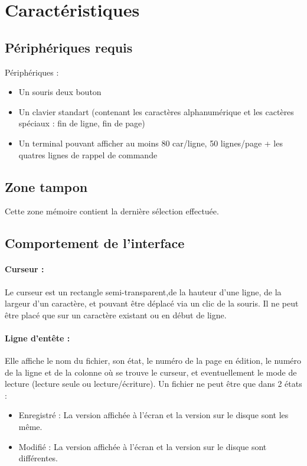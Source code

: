 
\section{Caractéristiques}
\subsection{Périphériques requis}
Périphériques :
\begin{itemize}
	\item Un souris deux bouton
	\item Un clavier standart (contenant les caractères alphanumérique et les cactères spéciaux : fin de ligne, fin de page)
	\item Un terminal pouvant afficher au moins 80 car/ligne, 50 lignes/page + les quatres lignes de rappel de commande
\end{itemize}

\subsection{Zone tampon}
Cette zone mémoire contient la dernière sélection effectuée.

\subsection{Comportement de l'interface}

\paragraph{Curseur :} Le curseur est un rectangle semi-transparent,de la hauteur d'une ligne, de la largeur d'un caractère, et pouvant être déplacé via un clic de la souris. Il ne peut être placé que sur un caractère existant ou en début de ligne.

\paragraph{Ligne d'entête :} Elle affiche le nom du fichier, son état, le numéro de la page en édition, le numéro de la ligne et de la colonne où se trouve le curseur, et eventuellement le mode de lecture (lecture seule ou lecture/écriture).
Un fichier ne peut être que dans 2 états :
\begin{itemize}
	\item Enregistré : La version affichée à l'écran et la version sur le disque sont les même.
	\item Modifié :	La version affichée à l'écran et la version sur le disque sont différentes.
\end{itemize}

